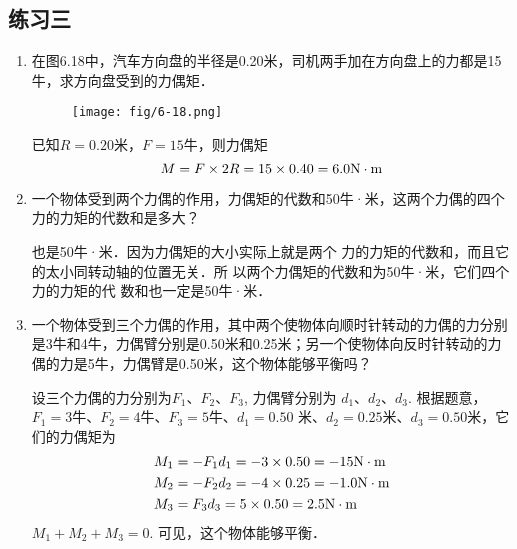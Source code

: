\subsection{练习三}
\begin{enumerate}
    \item 在图6.18中，汽车方向盘的半径是0.20米，司机两手加在方向盘上的力都是15牛，求方向盘受到的力偶矩．
    \begin{figure}[htp]
        \centering    \texttt{[image: fig/6-18.png]}
        \caption{}
        \end{figure}

    \begin{solution}
        已知$R=0.20$米，$F=15$牛，则力偶矩
\[M=F\times2R=15\times 0.40=6.0{\rm N\cdot m}  \]
    \end{solution}
    \item 一个物体受到两个力偶的作用，力偶矩的代数和50牛·米，这两个力偶的四个力的力矩的代数和是多大？

   \begin{solution}
        也是50牛·米．因为力偶矩的大小实际上就是两个
        力的力矩的代数和，而且它的太小同转动轴的位置无关．所
        以两个力偶矩的代数和为50牛·米，它们四个力的力矩的代
        数和也一定是50牛·米． 
    \end{solution}
    \item 一个物体受到三个力偶的作用，其中两个使物体向顺时针转动的力偶的力分别是3牛和4牛，力偶臂分别是0.50米和0.25米；另一个使物体向反时针转动的力偶的力是5牛，力偶臂是0.50米，这个物体能够平衡吗？


    \begin{solution}
        设三个力偶的力分别为$F_1$、$F_2$、$F_3$, 力偶臂分别为
        $d_1$、$d_2$、$d_3$. 根据题意，$F_1=3$牛、$F_2=4$牛、$F_3=5$牛、$d_1=0.50$
        米、$d_2=0.25$米、$d_3=0.50$米，它们的力偶矩为
        \[\begin{split}
            M_1&=-F_1d_1=-3\times0.50=-15{\rm N\cdot m} \\
        M_2&=-F_2d_2=-4\times0.25=-1.0{\rm N\cdot m} \\
        M_3&=F_3d_3=5\times0.50=2.5{\rm N\cdot m}       
        \end{split}\]
        $M_1+M_2+M_3=0$. 可见，这个物体能够平衡．
    \end{solution}
\end{enumerate}




